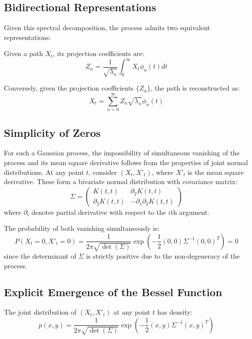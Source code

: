 \documentclass{article}
\begin{document}
\subsection{Bidirectional Representations}
Given this spectral decomposition, the process admits two equivalent representations:

Given a path $X_t$, its projection coefficients are:
\begin{equation}
    Z_n = \frac{1}{\sqrt{\lambda_n}} \int_0^\infty X_t \phi_n(t) dt
\end{equation}

Conversely, given the projection coefficients $\{Z_n\}$, the path is reconstructed as:
\begin{equation}
    X_t = \sum_{n=0}^{\infty} Z_n \sqrt{\lambda_n} \phi_n(t)
\end{equation}

\subsection{Simplicity of Zeros}
For such a Gaussian process, the impossibility of simultaneous vanishing of the process and its mean square derivative follows from the properties of joint normal distributions. At any point $t$, consider $(X_t, X'_t)$, where $X'_t$ is the mean square derivative. These form a bivariate normal distribution with covariance matrix:
\begin{equation}
    \Sigma = \begin{pmatrix} 
    K(t,t) & \partial_2K(t,t) \\
    \partial_2K(t,t) & -\partial_1\partial_2K(t,t)
    \end{pmatrix}
\end{equation}
where $\partial_i$ denotes partial derivative with respect to the $i$th argument.

The probability of both vanishing simultaneously is:
\begin{equation}
    P(X_t = 0, X'_t = 0) = \frac{1}{2\pi\sqrt{\det(\Sigma)}} \exp(-\frac{1}{2}(0,0)\Sigma^{-1}(0,0)^T) = 0
\end{equation}
since the determinant of $\Sigma$ is strictly positive due to the non-degeneracy of the process.

\subsection{Explicit Emergence of the Bessel Function}
The joint distribution of $(X_t, X'_t)$ at any point $t$ has density:
\begin{equation}
    p(x,y) = \frac{1}{2\pi\sqrt{\det(\Sigma)}} \exp\left(-\frac{1}{2}(x,y)\Sigma^{-1}(x,y)^T\right)
\end{equation}
\end{document}
